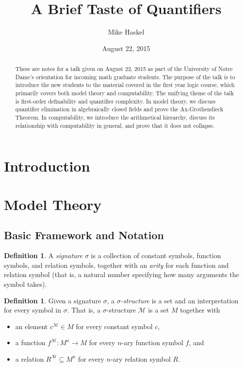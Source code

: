 \documentclass{article}
\title{A Brief Taste of Quantifiers}
\author{Mike Haskel}
\date{August 22, 2015}
\theoremstyle{plain}
\theoremstyle{definition}
\newtheorem{defn}[thm]{Definition}
\newcommand{\defterm}{\emph}
\begin{document}
\maketitle

\begin{abstract}
  These are notes for a talk given on August 22, 2015 as part of the
  University of Notre Dame's orientation for incoming math graduate
  students. The purpose of the talk is to introduce the new students
  to the material covered in the first year logic course, which
  primarily covers both model theory and computability. The unifying
  theme of the talk is first-order definability and quantifier
  complexity. In model theory, we discuss quantifier elimination in
  algebraically closed fields and prove the Ax-Grothendieck
  Theorem. In computability, we introduce the arithmetical hierarchy,
  discuss its relationship with computability in general, and prove
  that it does not collapse.
\end{abstract}

\section{Introduction}

\section{Model Theory}

\subsection{Basic Framework and Notation}

\begin{defn}
  A \defterm{signature} $\sigma$ is a collection of constant symbols,
  function symbols, and relation symbols, together with an
  \defterm{arity} for each function and relation symbol (that is, a
  natural number specifying how many arguments the symbol takes).
\end{defn}

\begin{defn}
  Given a signature $\sigma$, a \defterm{$\sigma$-structure} is a set
  and an interpretation for every symbol in $\sigma$. That is, a
  $\sigma$-structure $\mathcal{M}$ is a set $M$ together with
  \begin{itemize}
  \item an element $c^\mathcal{M} \in M$ for every constant symbol $c$,
  \item a function $f^\mathcal{M} : M^n \to M$ for every $n$-ary function symbol $f$, and
  \item a relation $R^\mathcal{M} \subseteq M^n$ for every $n$-ary relation symbol $R$.
  \end{itemize}
\end{defn}
\end{document}
